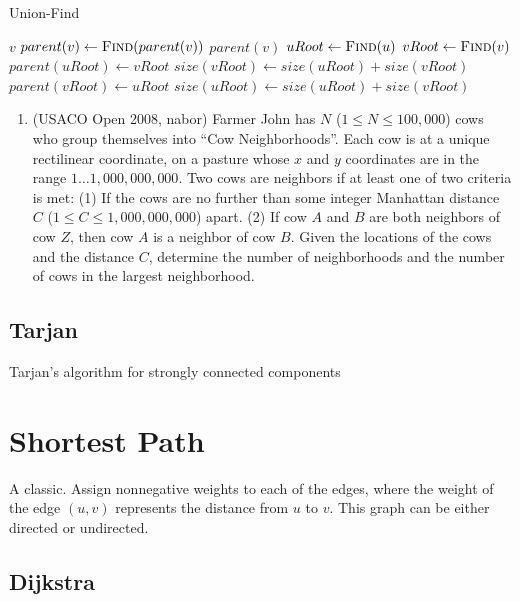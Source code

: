 \documentclass[11pt]{book}
\begin{document}
\begin{algorithm}[H]
\caption{Union-Find}
\begin{algorithmic}
		\State \Return $v$
    \EndIf
    \State $parent(v) \gets \Call{Find}{parent(v)}$
    \State \Return $parent(v)$
\EndFunction
{}
	\State $uRoot \gets \Call{Find}{u}$
	\State $vRoot \gets \Call{Find}{v}$
		\State \Return
	\EndIf
    	\State $parent(uRoot) \gets vRoot$
        \State $size(vRoot) \gets size(uRoot) + size(vRoot)$
    \Else
    	\State $parent(vRoot) \gets uRoot$
        \State $size(uRoot) \gets size(uRoot) + size(vRoot)$
    \EndIf
\EndFunction
\end{algorithmic}
\end{algorithm}

\begin{enumerate}
\item
(USACO Open 2008, nabor)
Farmer John has $N$ ($1 \le N 
\le 100,000$) cows who group themselves into ``Cow
Neighborhoods''. Each cow is at a unique rectilinear coordinate, on a pasture whose $x$ and $y$ coordinates are
in the range $1\ldots1,000,000,000$. Two cows are neighbors if at least one of two criteria is met: (1) If the cows are
no further than some integer Manhattan distance $C$ ($1 \le C \le 1,000,000,000$) apart. (2) If cow $A$ and $B$ are
both neighbors of cow $Z$, then cow $A$ is a neighbor of cow $B$. Given the locations of the cows and the distance
$C$, determine the number of neighborhoods and the number of cows in the largest neighborhood.
\end{enumerate}

\subsection{Tarjan}

Tarjan's algorithm for strongly connected components

\section{Shortest Path}

A classic. Assign nonnegative weights to each of the edges, where the weight of the edge $(u,v)$ represents the distance from $u$ to $v$. This graph can be either directed or undirected.

\subsection{Dijkstra}
\end{document}
